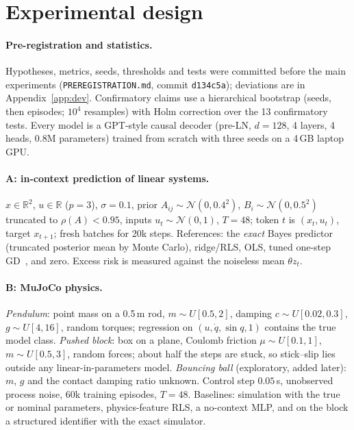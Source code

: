 \section{Experimental design}\label{sec:setup}

\paragraph{Pre-registration and statistics.} Hypotheses, metrics, seeds, thresholds and tests were committed before
the main experiments (\texttt{PREREGISTRATION.md}, commit \texttt{d134c5a}); deviations are in Appendix~\ref{app:dev}.
Confirmatory claims use a hierarchical bootstrap (seeds, then episodes; $10^4$ resamples) with Holm correction
over the 13 confirmatory tests. Every model is a GPT-style causal decoder (pre-LN, $d{=}128$, 4 layers, 4 heads, 0.8M
parameters) trained from scratch with three seeds on a 4\,GB laptop GPU.

\paragraph{A: in-context prediction of linear systems.} $x\in\mathbb{R}^2$, $u\in\mathbb{R}$ ($p{=}3$), $\sigma{=}0.1$,
prior $A_{ij}\sim\mathcal{N}(0,0.4^2)$, $B_i\sim\mathcal{N}(0,0.5^2)$ truncated to $\rho(A)<0.95$, inputs $u_t\sim\mathcal{N}(0,1)$,
$T{=}48$; token $t$ is $(x_t,u_t)$, target $x_{t+1}$; fresh batches for 20k steps. References: the \emph{exact} Bayes
predictor (truncated posterior mean by Monte Carlo), ridge/RLS, OLS, tuned one-step GD~\citep{vonoswald2023transformers},
and zero. Excess risk is measured against the noiseless mean $\theta z_t$.

\paragraph{B: MuJoCo physics.} \emph{Pendulum}: point mass on a 0.5\,m rod, $m\sim U[0.5,2]$, damping $c\sim U[0.02,0.3]$,
$g\sim U[4,16]$, random torques; regression on $(u,\dot q,\sin q,1)$ contains the true model class. \emph{Pushed block}:
box on a plane, Coulomb friction $\mu\sim U[0.1,1]$, $m\sim U[0.5,3]$, random forces; about half the steps are stuck, so
stick--slip lies outside any linear-in-parameters model. \emph{Bouncing ball} (exploratory, added later): $m$, $g$ and
the contact damping ratio unknown. Control step $0.05$\,s, unobserved process noise, 60k training episodes, $T{=}48$.
Baselines: simulation with the true or nominal parameters, physics-feature RLS, a no-context MLP, and on the block a
structured identifier with the exact simulator.

